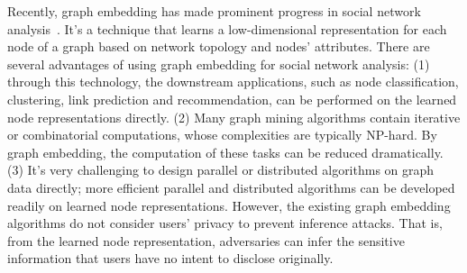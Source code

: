 \documentclass{article}
\begin{document}

Recently, graph embedding has made prominent progress in social network analysis~\citep{goyal2018graph,cui2018survey}. It's a technique that learns a low-dimensional representation for each node of a graph based on network topology and nodes' attributes. There are several advantages of using graph embedding for social network analysis: (1) through this technology, the downstream applications, such as node classification, clustering, link prediction and recommendation, can be performed on the learned node representations directly. (2) Many graph mining algorithms contain iterative or combinatorial computations, whose complexities are typically NP-hard. By graph embedding, the computation of these tasks can be reduced dramatically. (3) It's very challenging to design parallel or distributed algorithms on graph data directly; more efficient parallel and distributed algorithms can be developed readily on learned node representations. However, the existing graph embedding algorithms do not consider users' privacy to prevent inference attacks. That is, from the learned node representation, adversaries can infer the sensitive information that users have no intent to disclose originally.
\end{document}
